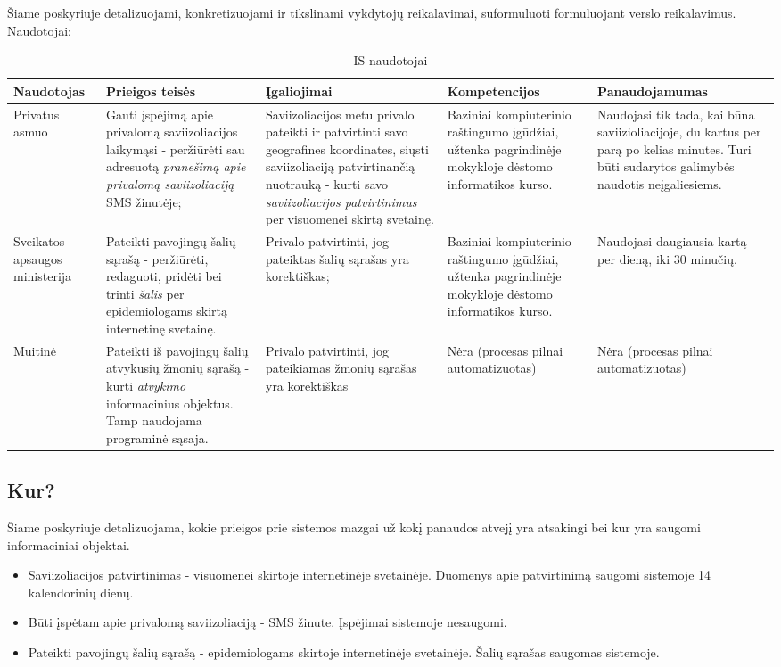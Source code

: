 \documentclass{VUMIFPSkursinis}
\begin{document}
Šiame poskyriuje detalizuojami, konkretizuojami ir tikslinami vykdytojų reikalavimai, suformuluoti formuluojant verslo reikalavimus. Naudotojai:
\begin{center}
	\small
	\begin{longtable}{|L{2cm}|C{3cm}|C{3cm}|C{3cm}|C{3cm}|}
		\caption{IS naudotojai}
		\label{table:users}
		\\ \hline
		Naudotojas & Prieigos teisės & Įgaliojimai & Kompetencijos & Panaudojamumas \\ \hline
		Privatus asmuo & Gauti įspėjimą apie privalomą saviizoliacijos laikymąsi - peržiūrėti sau adresuotą \emph{pranešimą apie privalomą saviizoliaciją} SMS žinutėje; & Saviizoliacijos metu privalo pateikti ir patvirtinti savo geografines koordinates, siųsti saviizoliaciją patvirtinančią nuotrauką - kurti savo \emph{saviizoliacijos patvirtinimus} per visuomenei skirtą svetainę. & Baziniai kompiuterinio raštingumo įgūdžiai, užtenka pagrindinėje mokykloje dėstomo informatikos kurso. & Naudojasi tik tada, kai būna saviizioliacijoje, du kartus per parą po kelias minutes. Turi būti sudarytos galimybės naudotis neįgaliesiems. \\ \hline
		Sveikatos apsaugos ministerija & Pateikti pavojingų šalių sąrašą - peržiūrėti, redaguoti, pridėti bei trinti \emph{šalis} per epidemiologams skirtą internetinę svetainę. & Privalo patvirtinti, jog pateiktas šalių sąrašas yra korektiškas; & Baziniai kompiuterinio raštingumo įgūdžiai, užtenka pagrindinėje mokykloje dėstomo informatikos kurso. & Naudojasi daugiausia kartą per dieną, iki 30 minučių. \\ \hline
		Muitinė & Pateikti iš pavojingų šalių atvykusių žmonių sąrašą - kurti \emph{atvykimo} informacinius objektus. Tamp naudojama programinė sąsaja. & Privalo patvirtinti, jog pateikiamas žmonių sąrašas yra korektiškas & Nėra (procesas pilnai automatizuotas) & Nėra (procesas pilnai automatizuotas)                                     \\ \hline
	\end{longtable}
\end{center}


\subsection{Kur?}
Šiame poskyriuje detalizuojama, kokie prieigos prie sistemos mazgai už kokį panaudos atvejį yra atsakingi bei kur yra saugomi informaciniai objektai.

\begin{itemize}
	\item Saviizoliacijos patvirtinimas - visuomenei skirtoje internetinėje svetainėje. Duomenys apie patvirtinimą saugomi sistemoje 14 kalendorinių dienų.
	\item Būti įspėtam apie privalomą saviizoliaciją - SMS žinute. Įspėjimai sistemoje nesaugomi.
	\item Pateikti pavojingų šalių sąrašą - epidemiologams skirtoje internetinėje svetainėje. Šalių sąrašas saugomas sistemoje.
\end{itemize}
\end{document}
